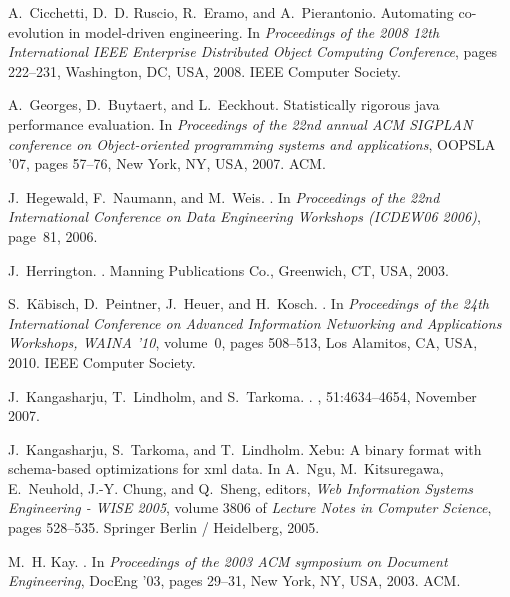 \documentclass{sig-alternate}
\begin{document}
\begin{thebibliography}{10}
A.~Cicchetti, D.~D. Ruscio, R.~Eramo, and A.~Pierantonio.
\newblock Automating co-evolution in model-driven engineering.
\newblock In {\em Proceedings of the 2008 12th International IEEE Enterprise
  Distributed Object Computing Conference}, pages 222--231, Washington, DC,
  USA, 2008. IEEE Computer Society.

A.~Georges, D.~Buytaert, and L.~Eeckhout.
\newblock Statistically rigorous java performance evaluation.
\newblock In {\em Proceedings of the 22nd annual ACM SIGPLAN conference on
  Object-oriented programming systems and applications}, OOPSLA '07, pages
  57--76, New York, NY, USA, 2007. ACM.

J.~Hegewald, F.~Naumann, and M.~Weis.
.
\newblock In {\em Proceedings of the 22nd International Conference on Data
  Engineering Workshops (ICDEW06 2006)}, page~81, 2006.

J.~Herrington.
.
\newblock Manning Publications Co., Greenwich, CT, USA, 2003.

S.~K\"{a}bisch, D.~Peintner, J.~Heuer, and H.~Kosch.
.
\newblock In {\em Proceedings of the 24th International Conference on Advanced
  Information Networking and Applications Workshops, WAINA '10}, volume~0,
  pages 508--513, Los Alamitos, CA, USA, 2010. IEEE Computer Society.

J.~Kangasharju, T.~Lindholm, and S.~Tarkoma.
.
, 51:4634--4654, November 2007.

J.~Kangasharju, S.~Tarkoma, and T.~Lindholm.
\newblock Xebu: A binary format with schema-based optimizations for xml data.
\newblock In A.~Ngu, M.~Kitsuregawa, E.~Neuhold, J.-Y. Chung, and Q.~Sheng,
  editors, {\em Web Information Systems Engineering - WISE 2005}, volume 3806
  of {\em Lecture Notes in Computer Science}, pages 528--535. Springer Berlin /
  Heidelberg, 2005.

M.~H. Kay.
.
\newblock In {\em Proceedings of the 2003 ACM symposium on Document
  Engineering}, DocEng '03, pages 29--31, New York, NY, USA, 2003. ACM.


\end{thebibliography}
\end{document}

